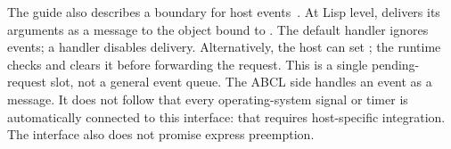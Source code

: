 The guide also describes a boundary for host events~\cite{guide}.
At Lisp level,  delivers its arguments as a
\code{[:signal ...]} message to the object bound to
. The default handler ignores events; a
 handler disables delivery.
Alternatively, the host can set ;
the runtime checks and clears it before forwarding the request.
This is a single pending-request slot, not a general event queue.
The ABCL side handles an event as a message. It does not follow that
every operating-system signal or timer is automatically connected to
this interface: that requires host-specific integration.
The interface also does not promise express preemption.


